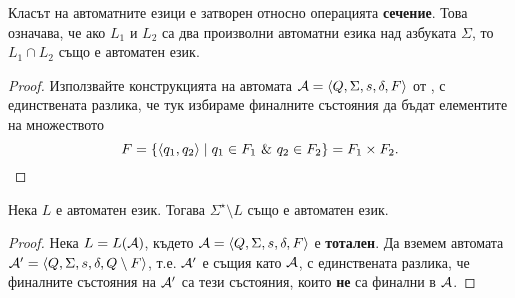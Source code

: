 \begin{cor}
  Класът на автоматните езици е затворен относно операцията {\bf сечение}.
  Това означава, че ако $L_1$ и $L_2$ са два произволни автоматни езика над азбуката $\Sigma$, то $L_1\cap L_2$
  също е автоматен език.
\end{cor}
\begin{proof}
  Използвайте конструкцията на автомата $\mathcal{A} = \langle{Q,\Sigma,s,\delta,F}\rangle$ от ,
  с единствената разлика, че тук избираме финалните състояния да бъдат елементите на множеството
  \[F = \{\pair{q_1,q_2} \mid q_1 \in F_1\ \&\ q_2 \in F_2\} = F_1\times F_2.\]
\end{proof}

\begin{prop}
  Нека $L$ е автоматен език.
  Тогава $\Sigma^\star\setminus L$ също е автоматен език.
\end{prop}
\begin{proof}
  Нека $L = L(\mathcal{A})$, където $\mathcal{A} = \langle{Q,\Sigma,s,\delta,F}\rangle$ е {\bf тотален}.
  Да вземем автомата $\mathcal{A}' = \langle{Q,\Sigma,s,\delta,Q\setminus F}\rangle$,
  т.е. $\mathcal{A}'$ е същия като $\mathcal{A}$, с единствената разлика, че финалните състояния на $\mathcal{A}'$
  са тези състояния, които {\bf не} са финални в $\mathcal{A}$.
\end{proof}

